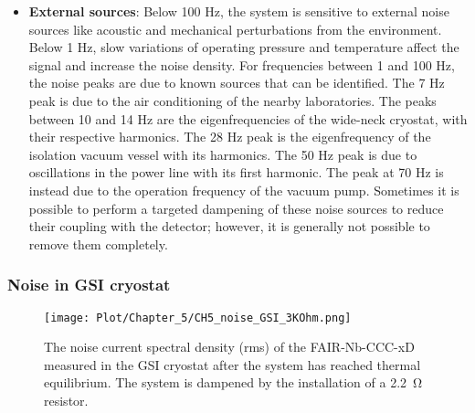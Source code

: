 \documentclass[12pt,a4paper]{report}
\begin{document}
\begin{itemize}
        	\item \textbf{External sources}: Below 100 Hz, the system is sensitive to external noise sources like acoustic and mechanical perturbations from the environment. Below 1 Hz, slow variations of operating pressure and temperature affect the signal and increase the noise density. For frequencies between 1 and 100 Hz, the noise peaks are due to known sources that can be identified. The 7 Hz peak is due to the air conditioning of the nearby laboratories. The peaks between 10 and 14 Hz are the eigenfrequencies of the wide-neck cryostat, with their respective harmonics. The 28 Hz peak is the eigenfrequency of the isolation vacuum vessel with its harmonics. The 50 Hz peak is due to oscillations in the power line with its first harmonic. The peak at 70 Hz is instead due to the operation frequency of the vacuum pump. Sometimes it is possible to perform a targeted dampening of these noise sources to reduce their coupling with the detector; however, it is generally not possible to remove them completely.
        	\end{itemize}
        \subsubsection{Noise in GSI cryostat}
        \begin{figure}[H]
        	\centering
        	\texttt{[image: Plot/Chapter\_5/CH5\_noise\_GSI\_3KOhm.png]}
        	\caption{\small{The noise current spectral density (rms) of the FAIR-Nb-CCC-xD measured in the GSI cryostat after the system has reached thermal equilibrium. The system is dampened by the installation of a \SI{2.2}{\ohm} resistor.}}
        	\label{CH5_noise_GSI}
        \end{figure}
        
\end{document}
